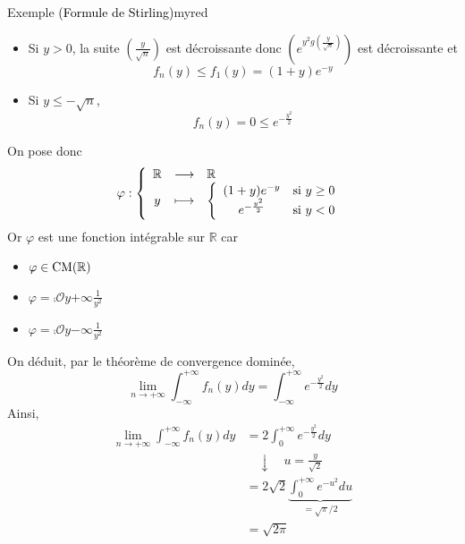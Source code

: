 \begin{omed}{Exemple \textcolor{black}{(Formule de Stirling)}}{myred}
\begin{itemize}
\begin{itemize}
                \item Si $y > 0$, la suite $\left( \frac{y}{\sqrt{n}} \right)$ est décroissante donc $\left( e^{ y^2 g \left( \frac{y}{\sqrt{n}} \right) } \right)$ est décroissante et 
                \[ f_n(y) \leq f_1(y) = (1+y)e^{-y} \]
                \item Si $y \leq -\sqrt{n}$, \[ f_n(y)= 0 \leq e^{-\frac{y^2}{2}} \]
            \end{itemize}
            On pose donc 
            \[ \fonction{\varphi}{\mathbb{R}}{\mathbb{R}}{y}{\sisi{(1+y)e^{-y}}{y \geq 0}{e^{-\frac{y^2}{2}}}{y < 0}} \]
            Or $\varphi$ est une fonction intégrable sur $\mathbb{R}$ car 
            \begin{itemize}
                \item $\varphi \in \operatorname{CM}(\mathbb{R})$
                \item $\varphi = \comp{\mathcal{O}}{y}{+\infty}{\frac{1}{y^2}}$
                \item $\varphi = \comp{\mathcal{O}}{y}{-\infty}{\frac{1}{y^2}}$
            \end{itemize}
        \end{itemize}
        On déduit, par le théorème de convergence dominée, 
        \[ \lim_{n \to +\infty} \int_{-\infty}^{+\infty} f_n(y)dy = \int_{-\infty}^{+\infty} e^{-\frac{y^2}{2}}dy \]  
        Ainsi, 
        \begin{align*}
            \lim_{n \to +\infty} \int_{-\infty}^{+\infty} f_n(y)dy 
            &= 2 \int_{0}^{+\infty} e^{-\frac{y^2}{2}}dy\\
            &\quad \downarrow \quad u = \frac{y}{\sqrt{2}} \\
            &= 2 \sqrt{2} \underbrace{\int_{0}^{+\infty} e^{-u^2} du}_{= \sqrt{\pi} / 2} \\
            &= \sqrt{2 \pi}
        \end{align*}
    \end{omed}

